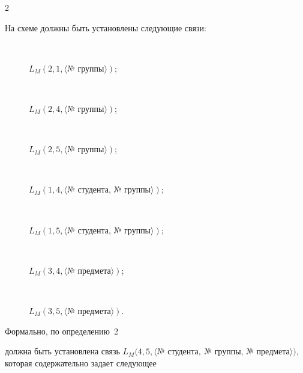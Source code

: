 \begin{multicols}{2}



  На схеме должны быть установлены следующие связи:

\begin{description}

\item[\,]  $L_M(2,1,\langle \mbox{№~группы}\rangle)$;

\item[\,]  $L_M(2,4,\langle \mbox{№~группы}\rangle)$;



\pagebreak





\item[\,] $L_M(2,5,\langle \mbox{№~группы}\rangle)$;

\item[\,] $L_M(1,4,\langle\mbox{№~студента,\ №~группы}\rangle)$;

\item[\,]  $L_M(1,5,\langle\mbox{№~студента,\ №~группы}\rangle)$;

\item[\,]  $L_M(3,4,\langle\mbox{№~предмета}\rangle)$;

\item[\,] $L_M(3,5,\langle\mbox{№~предмета}\rangle)$.

\end{description}



 Формально, по определению~2

должна быть уста\-нов\-ле\-на связь $L_M(4,5,\langle\mbox{№~студента},\

\mbox{№~группы}$, $\mbox{№~предмета}\rangle)$, которая содержательно задает следующее


\end{multicols}
